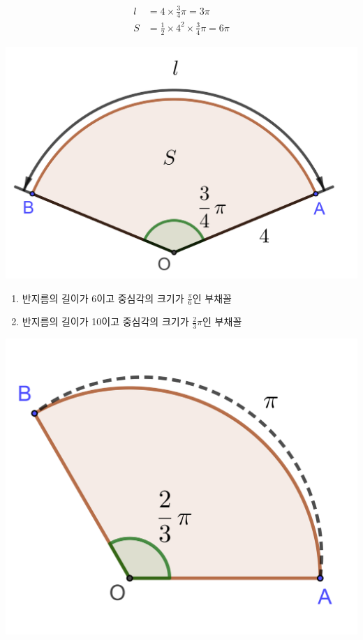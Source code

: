 \documentclass{oblivoir}
\begin{document}
%
\label{arc4}
\noindent
\begin{minipage}{.6\textwidth}
\begin{align*}
l&=4\times\frac34\pi=3\pi\\
S&=\frac12\times4^2\times\frac34\pi=6\pi
\end{align*}
\end{minipage}
\begin{minipage}{.3\textwidth}
\centering
\includegraphics[width=\textwidth]{arc_4}
\end{minipage}

%
\begin{enumerate}\label{arc5}
\item
반지름의 길이가 6이고 중심각의 크기가 \(\frac\pi6\)인 부채꼴
\item
반지름의 길이가 10이고 중심각의 크기가 \(\frac23\pi\)인 부채꼴
\end{enumerate}

\vspace{30pt}
\noindent
\begin{minipage}{.6\textwidth}
%
\label{arc6}
\end{minipage}
\begin{minipage}{.3\textwidth}
\includegraphics[width=.7\textwidth]{arc_6}
\end{minipage}
\end{document}
